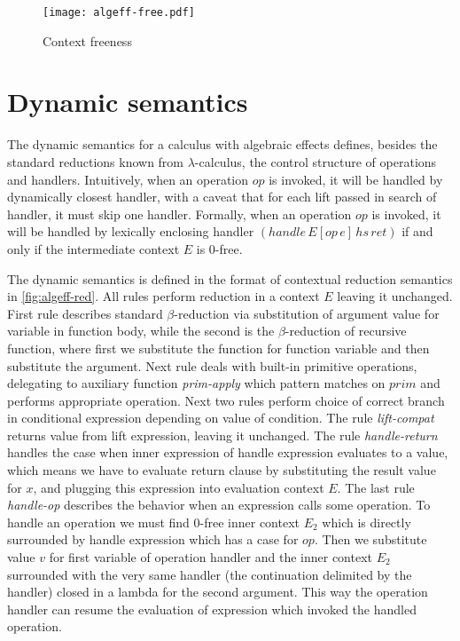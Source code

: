 \documentclass[inz, english, shortabstract]{iithesis}
\newcommand{\LC}{\(\lambda\)-calculus}
\begin{document}
\begin{figure}
  \centering
  \texttt{[image: algeff-free.pdf]}
  \caption{Context freeness}
  \label{fig:algeff-free}  
\end{figure}

\section{Dynamic semantics}
The dynamic semantics for a calculus with algebraic effects defines, besides the standard reductions known from \LC{}, the control structure of operations and handlers.
Intuitively, when an operation $op$ is invoked, it will be handled by dynamically closest handler, with a caveat that for each lift passed in search of handler, it must skip one handler.
Formally, when an operation $ op $ is invoked, it will be handled by lexically enclosing handler $ (handle \, E[op \, e] \, hs \, ret) $ if and only if the intermediate context $ E $ is $0$-free\cite{Biernacki2017}.

The dynamic semantics is defined in the format of contextual reduction semantics in \autoref{fig:algeff-red}.
All rules perform reduction in a context $ E $ leaving it unchanged.
First rule describes standard $ \beta $-reduction via substitution of argument value for variable in function body, while the second is the $ \beta $-reduction of recursive function, where first we substitute the function for function variable and then substitute the argument.
Next rule deals with built-in primitive operations, delegating to auxiliary function \textit{prim-apply} which pattern matches on $ prim $ and performs appropriate operation.
Next two rules perform choice of correct branch in conditional expression depending on value of condition.
The rule \textit{lift-compat} returns value from lift expression, leaving it unchanged.
The rule \textit{handle-return} handles the case when inner expression of handle expression evaluates to a value, which means we have to evaluate return clause by substituting the result value for $ x $, and plugging this expression into evaluation context $ E $.
The last rule \textit{handle-op} describes the behavior when an expression calls some operation.
To handle an operation we must find $0$-free inner context $ E_2 $ which is directly surrounded by handle expression which has a case for $ op $.
Then we substitute value $ v $ for first variable of operation handler and the inner context $ E_2 $ surrounded with the very same handler (the continuation delimited by the handler) closed in a lambda for the second argument.
This way the operation handler can resume the evaluation of expression which invoked the handled operation.
\end{document}
